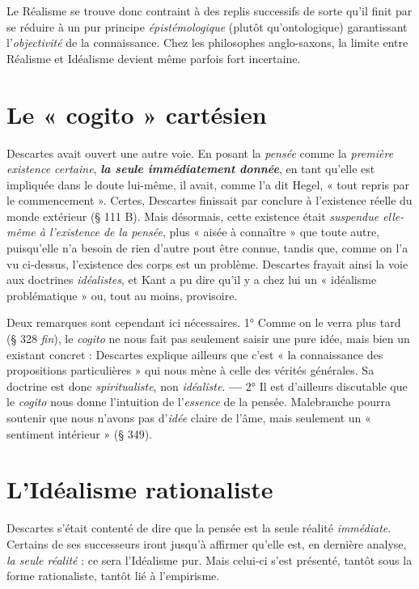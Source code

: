 Le Réalisme se trouve donc contraint à des replis successifs de
sorte qu’il finit par se réduire à un pur principe {\it épistémologique} (plutôt
qu’ontologique) garantissant l’{\it objectivité} de la connaissance. Chez les
philosophes anglo-saxons, la limite entre Réalisme et Idéalisme
devient même parfois fort incertaine.

\section{Le « cogito » cartésien}%
Descartes avait ouvert une
autre voie. En posant la {\it pensée} comme la {\it première existence certaine},
\textbf{\textit {la seule immédiatement donnée}}, en tant qu’elle est impliquée
dans le doute lui-même, il avait, comme l’a dit Hegel, « tout repris
par le commencement ». Certes, Descartes finissait par conclure à
l'existence réelle du monde extérieur (§ 111 B). Mais désormais, cette
existence était {\it suspendue elle-même à l'existence de la pensée}, plus
« aisée à connaître » que toute autre, puisqu'elle n’a besoin de rien
d'autre pout être connue, tandis que, comme on l’a vu ci-dessus,
l'existence des corps est un problème. Descartes frayait ainsi la voie
aux doctrines {\it idéalistes}, et Kant a pu dire qu’il y a chez lui un « idéalisme
problématique » ou, tout au moins, provisoire.

Deux remarques sont cependant ici nécessaires. 1° Comme on le verra
plus tard (§ 328 {\it fin}), le {\it cogito} ne nous fait pas seulement saisir une pure idée,
mais bien un existant concret : Descartes explique ailleurs que c’est « la
connaissance des propositions particulières » qui nous mène à celle des
vérités générales.
Sa doctrine est donc {\it spiritualiste}, non {\it idéaliste}. {\bf —} 2° Il
est d’ailleurs discutable que le {\it cogito} nous donne l'intuition de l'{\it essence} de
la pensée. Malebranche pourra soutenir que nous n'avons pas d'{\it idée}
claire de l'âme, mais seulement un « sentiment intérieur » (§ 349).

\section{L’Idéalisme rationaliste}%
Descartes s'était contenté de
dire que la pensée est la seule réalité {\it immédiate}. Certains de ses
successeurs iront jusqu’à affirmer qu’elle est, en dernière analyse,
{\it la seule réalité} : ce sera l’Idéalisme pur. Mais celui-ci s’est présenté,
tantôt sous la forme rationaliste, tantôt lié à l’empirisme.

